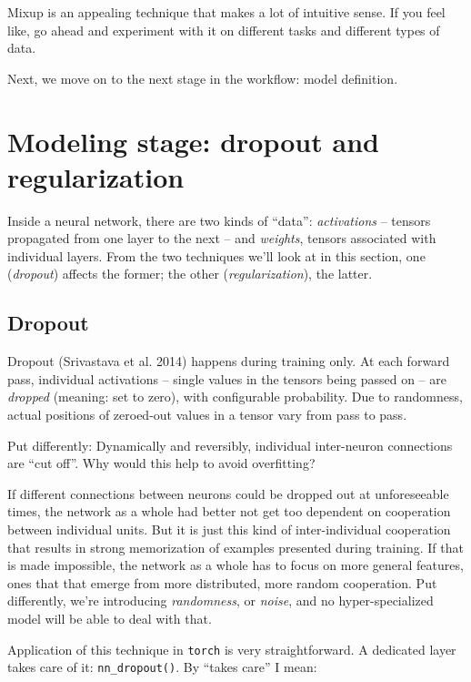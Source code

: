 \documentclass[
  letterpaper,
]{krantz}
\begin{document}
Mixup is an appealing technique that makes a lot of intuitive sense. If
you feel like, go ahead and experiment with it on different tasks and
different types of data.

Next, we move on to the next stage in the workflow: model definition.

\hypertarget{modeling-stage-dropout-and-regularization}{%
\section{Modeling stage: dropout and
regularization}\label{modeling-stage-dropout-and-regularization}}

Inside a neural network, there are two kinds of ``data'':
\emph{activations} -- tensors propagated from one layer to the next --
and \emph{weights}, tensors associated with individual layers. From the
two techniques we'll look at in this section, one (\emph{dropout})
affects the former; the other (\emph{regularization}), the latter.

\hypertarget{dropout}{%
\subsection{\texorpdfstring{Dropout}{Dropout}}\label{dropout}}

Dropout (Srivastava et al. 2014) happens during training only. At each
forward pass, individual activations -- single values in the tensors
being passed on -- are \emph{dropped} (meaning: set to zero), with
configurable probability. Due to randomness, actual positions of
zeroed-out values in a tensor vary from pass to pass.

Put differently: Dynamically and reversibly, individual inter-neuron
connections are ``cut off''. Why would this help to avoid overfitting?

If different connections between neurons could be dropped out at
unforeseeable times, the network as a whole had better not get too
dependent on cooperation between individual units. But it is just this
kind of inter-individual cooperation that results in strong memorization
of examples presented during training. If that is made impossible, the
network as a whole has to focus on more general features, ones that that
emerge from more distributed, more random cooperation. Put differently,
we're introducing \emph{randomness}, or \emph{noise}, and no
hyper-specialized model will be able to deal with that.

Application of this technique in \texttt{torch} is very straightforward.
A dedicated layer takes care of it: \texttt{nn\_dropout()}. By ``takes
care'' I mean:
\end{document}
